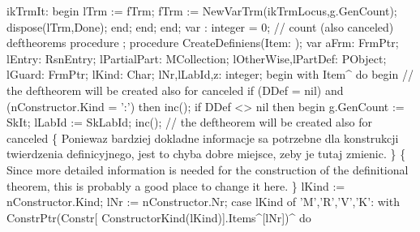          ikTrmIt:
            begin lTrm := fTrm; fTrm := NewVarTrm(ikTrmLocus,g.GenCount);
            dispose(lTrm,Done);
            end;
      end;
end;
\eatline
{}\nwendcode{}\nwdocspar
\nwenddocs{}\endmoddef\nwstartdeflinemarkup{}\nwenddeflinemarkup
var : integer = 0;   // count (also canceled) deftheorems
procedure ;
   procedure CreateDefiniens(Item: );
   var
      aFrm: FrmPtr;
      lEntry: RsnEntry;
      lPartialPart: MCollection;
      lOtherWise,lPartDef: PObject;
      lGuard: FrmPtr;
      lKind: Char;
      lNr,lLabId,z: integer;
   begin
      with Item^ do
      begin
         // the deftheorem will be created also for canceled
         if (DDef = nil) and (nConstructor.Kind = ':') then inc();
         if DDef <> nil then
         begin
            g.GenCount := SkIt; lLabId := SkLabId;
            inc();  // the deftheorem will be created also for canceled
            \{ Poniewaz bardziej dokladne informacje sa potrzebne dla
              konstrukcji twierdzenia definicyjnego, jest to chyba dobre
              miejsce, zeby je tutaj zmienic. \}
            \{ Since more detailed information is needed for
              the construction of the definitional theorem, this is probably a good
              place to change it here. \}
            lKind := nConstructor.Kind;
            lNr := nConstructor.Nr;
            case lKind of
               'M','R','V','K':
                  with ConstrPtr(Constr[ ConstructorKind(lKind)].Items^[lNr])^ do
